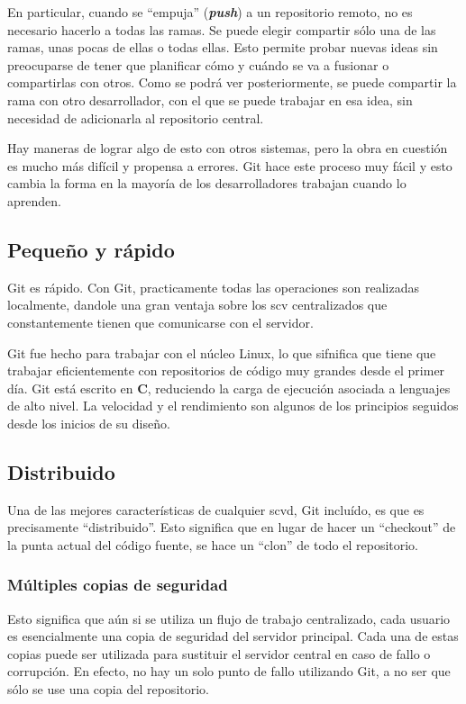 \documentclass[12pt, spanish, oneside, onecolumn, a4paper]{report}
\begin{document}
En particular, cuando se ``empuja'' (\emph{\textbf{push}}) a un repositorio remoto, no es necesario hacerlo a todas las ramas. Se puede elegir compartir sólo una de las ramas, unas pocas de ellas o todas ellas. Esto permite probar nuevas ideas sin preocuparse de tener que planificar cómo y cuándo se va a fusionar o compartirlas con otros. Como se podrá ver posteriormente, se puede compartir la rama con otro desarrollador, con el que se puede trabajar en esa idea, sin necesidad de adicionarla al repositorio central.

Hay maneras de lograr algo de esto con otros sistemas, pero la obra en cuestión es mucho más difícil y propensa a errores. Git hace este proceso muy fácil y esto cambia la forma en la mayoría de los desarrolladores trabajan cuando lo aprenden.


\subsection{Pequeño y rápido}
\label{sec:smallandfast}

Git es rápido. Con Git, practicamente todas las operaciones son realizadas localmente, dandole una gran ventaja sobre los \gls{scv} centralizados que constantemente tienen que comunicarse con el servidor.

Git fue hecho para trabajar con el núcleo Linux, lo que sifnifica que tiene que trabajar eficientemente con repositorios de código muy grandes desde el primer día. Git está escrito en \textbf{C}, reduciendo la carga de ejecución asociada a lenguajes de alto nivel. La velocidad y el rendimiento son algunos de los principios seguidos desde los inicios de su diseño.

\subsection{Distribuido}
\label{sec:distributed}

Una de las mejores características de cualquier \gls{scvd}, Git incluído, es que es precisamente ``distribuido''. Esto significa que en lugar de hacer un ``checkout'' de la punta actual del código fuente, se hace un ``clon'' de todo el repositorio.

\subsubsection{Múltiples copias de seguridad}
\label{sec:multiplebackups}

Esto significa que aún si se utiliza un flujo de trabajo centralizado, cada usuario es esencialmente una copia de seguridad del servidor principal. Cada una de estas copias puede ser utilizada para sustituir el servidor central en caso de fallo o corrupción. En efecto, no hay un solo punto de fallo utilizando Git, a no ser que sólo se use una copia del repositorio.
\end{document}
